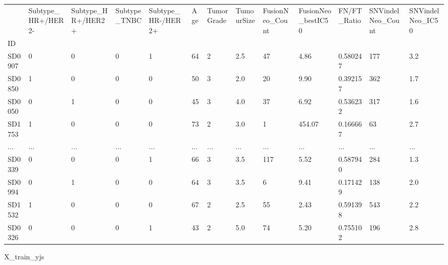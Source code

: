 \documentclass[
  letterpaper,
  DIV=11,
  numbers=noendperiod]{scrartcl}
\newenvironment{Shaded}{\begin{snugshade}}{\end{snugshade}}
\newcommand{\NormalTok}[1]{\textcolor[rgb]{0.00,0.23,0.31}{#1}}
\begin{document}
\begin{longtable}[]{@{}lllllllllllll@{}}
\toprule\noalign{}
& Subtype\_HR+/HER2- & Subtype\_HR+/HER2+ & Subtype\_TNBC &
Subtype\_HR-/HER2+ & Age & TumorGrade & TumourSize & FusionNeo\_Count &
FusionNeo\_bestIC50 & FN/FT\_Ratio & SNVindelNeo\_Count &
SNVindelNeo\_IC50 \\
ID & & & & & & & & & & & & \\
\midrule\noalign{}
\endhead
\bottomrule\noalign{}
\endlastfoot
SD0907 & 0 & 0 & 0 & 1 & 64 & 2 & 2.5 & 47 & 4.86 & 0.580247 & 177 &
3.2 \\
SD0850 & 1 & 0 & 0 & 0 & 50 & 3 & 2.0 & 20 & 9.90 & 0.392157 & 362 &
1.7 \\
SD0050 & 0 & 1 & 0 & 0 & 45 & 3 & 4.0 & 37 & 6.92 & 0.536232 & 317 &
1.6 \\
SD1753 & 1 & 0 & 0 & 0 & 73 & 2 & 3.0 & 1 & 454.07 & 0.166667 & 63 &
2.7 \\
... & ... & ... & ... & ... & ... & ... & ... & ... & ... & ... & ... &
... \\
SD0339 & 0 & 0 & 0 & 1 & 66 & 3 & 3.5 & 117 & 5.52 & 0.587940 & 284 &
1.3 \\
SD0994 & 0 & 1 & 0 & 0 & 64 & 3 & 3.5 & 6 & 9.41 & 0.171429 & 138 &
2.0 \\
SD1532 & 1 & 0 & 0 & 0 & 67 & 2 & 2.5 & 55 & 2.43 & 0.591398 & 543 &
2.2 \\
SD0326 & 0 & 0 & 0 & 1 & 43 & 2 & 5.0 & 74 & 5.20 & 0.755102 & 196 &
2.8 \\
\end{longtable}

\begin{Shaded}
\begin{Highlighting}[]
\NormalTok{X\_train\_yjs}
\end{Highlighting}
\end{Shaded}
\end{document}
